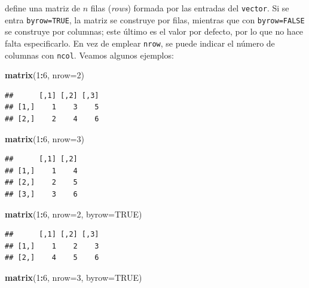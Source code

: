 \documentclass[]{book}
\newenvironment{Shaded}{\begin{snugshade}}{\end{snugshade}}
\newcommand{\DataTypeTok}[1]{\textcolor[rgb]{0.13,0.29,0.53}{#1}}
\newcommand{\DecValTok}[1]{\textcolor[rgb]{0.00,0.00,0.81}{#1}}
\newcommand{\KeywordTok}[1]{\textcolor[rgb]{0.13,0.29,0.53}{\textbf{#1}}}
\newcommand{\NormalTok}[1]{#1}
\newcommand{\OperatorTok}[1]{\textcolor[rgb]{0.81,0.36,0.00}{\textbf{#1}}}
\newcommand{\OtherTok}[1]{\textcolor[rgb]{0.56,0.35,0.01}{#1}}
\theoremstyle{definition}
\theoremstyle{definition}
\theoremstyle{definition}
\theoremstyle{remark}
\begin{document}
define una matriz de \(n\) filas (\emph{rows}) formada por las entradas del \texttt{vector}. Si se entra \texttt{byrow=TRUE}, la matriz se construye por filas, mientras que con \texttt{byrow=FALSE} se construye por columnas; este último es el valor por defecto, por lo que no hace falta especificarlo. En vez de emplear \texttt{nrow}, se puede indicar el número de columnas con \texttt{ncol}. Veamos algunos ejemplos:

\begin{Shaded}
\begin{Highlighting}[]
\KeywordTok{matrix}\NormalTok{(}\DecValTok{1}\OperatorTok{:}\DecValTok{6}\NormalTok{, }\DataTypeTok{nrow=}\DecValTok{2}\NormalTok{)}
\end{Highlighting}
\end{Shaded}

\begin{verbatim}
##      [,1] [,2] [,3]
## [1,]    1    3    5
## [2,]    2    4    6
\end{verbatim}

\begin{Shaded}
\begin{Highlighting}[]
\KeywordTok{matrix}\NormalTok{(}\DecValTok{1}\OperatorTok{:}\DecValTok{6}\NormalTok{, }\DataTypeTok{nrow=}\DecValTok{3}\NormalTok{)}
\end{Highlighting}
\end{Shaded}

\begin{verbatim}
##      [,1] [,2]
## [1,]    1    4
## [2,]    2    5
## [3,]    3    6
\end{verbatim}

\begin{Shaded}
\begin{Highlighting}[]
\KeywordTok{matrix}\NormalTok{(}\DecValTok{1}\OperatorTok{:}\DecValTok{6}\NormalTok{, }\DataTypeTok{nrow=}\DecValTok{2}\NormalTok{, }\DataTypeTok{byrow=}\OtherTok{TRUE}\NormalTok{)}
\end{Highlighting}
\end{Shaded}

\begin{verbatim}
##      [,1] [,2] [,3]
## [1,]    1    2    3
## [2,]    4    5    6
\end{verbatim}

\begin{Shaded}
\begin{Highlighting}[]
\KeywordTok{matrix}\NormalTok{(}\DecValTok{1}\OperatorTok{:}\DecValTok{6}\NormalTok{, }\DataTypeTok{nrow=}\DecValTok{3}\NormalTok{, }\DataTypeTok{byrow=}\OtherTok{TRUE}\NormalTok{)}
\end{Highlighting}
\end{Shaded}
\end{document}

